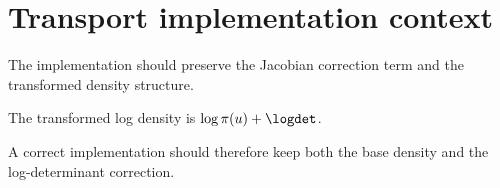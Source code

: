 \section{Transport implementation context}
The implementation should preserve the Jacobian correction term and the transformed density structure.

\begin{proposition}\label{prop:transport-implementation}
The transformed log density is $\log \pi(u) + \logdet$.
\end{proposition}

A correct implementation should therefore keep both the base density and the log-determinant correction.
